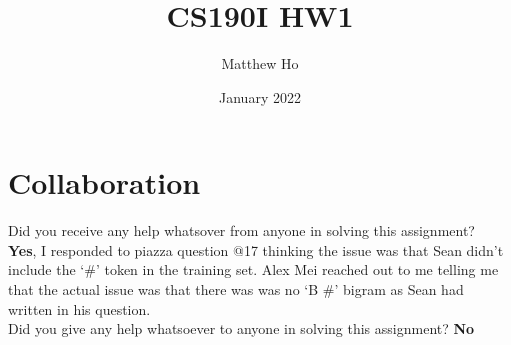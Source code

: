 \documentclass{article}
\title{CS190I HW1}
\author{Matthew Ho}
\date{January 2022}
\begin{document}
\maketitle

\section{Collaboration}
Did you receive any help whatsover from anyone in solving this assignment? \\
\textbf{Yes}, I responded to piazza question @17 thinking the issue was that Sean didn't include the `\#' token in the training set. Alex Mei reached out to me telling me that the actual issue was that there was was no `B \#' bigram as Sean had written in his question.  \\
Did you give any help whatsoever to anyone in solving this assignment? \textbf{No}
\end{document}
